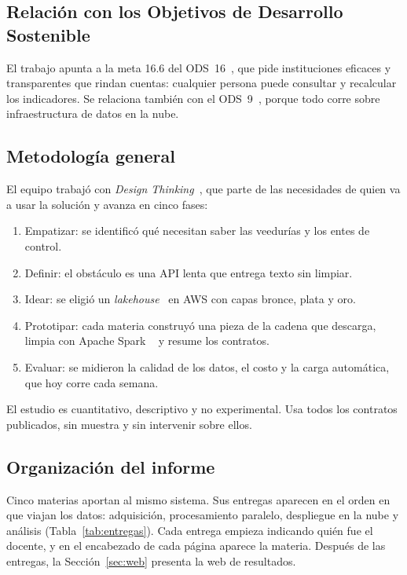 \documentclass[conference,letterpaper]{IEEEtran}
\begin{document}
\subsection{Relación con los Objetivos de Desarrollo Sostenible}
El trabajo apunta a la meta 16.6 del ODS~16~\cite{onu_ods16}, que pide instituciones eficaces y
transparentes que rindan cuentas: cualquier persona puede consultar y recalcular los indicadores. Se
relaciona también con el ODS~9~\cite{onu_ods9}, porque todo corre sobre infraestructura de datos en la
nube.

\subsection{Metodología general}
El equipo trabajó con \textit{Design Thinking}~\cite{brown2008}, que parte de las necesidades de quien
va a usar la solución y avanza en cinco fases:
\begin{enumerate}[leftmargin=*]
  \item Empatizar: se identificó qué necesitan saber las veedurías y los entes de control.
  \item Definir: el obstáculo es una API lenta que entrega texto sin limpiar.
  \item Idear: se eligió un \textit{lakehouse}~\cite{armbrust2021} en AWS con capas bronce, plata y oro.
  \item Prototipar: cada materia construyó una pieza de la cadena que descarga, limpia con Apache Spark
       ~\cite{zaharia2016} y resume los contratos.
  \item Evaluar: se midieron la calidad de los datos, el costo y la carga automática, que hoy corre cada semana.
\end{enumerate}
El estudio es cuantitativo, descriptivo y no experimental. Usa todos los contratos publicados, sin
muestra y sin intervenir sobre ellos.

\subsection{Organización del informe}
Cinco materias aportan al mismo sistema. Sus entregas aparecen en el orden en que viajan los datos:
adquisición, procesamiento paralelo, despliegue en la nube y análisis (Tabla~\ref{tab:entregas}). Cada
entrega empieza indicando quién fue el docente, y en el encabezado de cada página aparece la materia. Después de las entregas, la Sección~\ref{sec:web} presenta la web de resultados.
\end{document}
